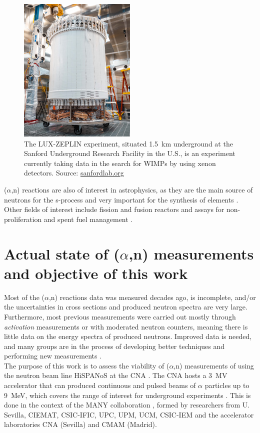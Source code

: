 \documentclass[a4paper,12pt]{report}
\newcommand{\an}{($\alpha$,n) }
\begin{document}
\begin{figure}[H]
	\centering
	\includegraphics[width=0.5\textwidth]{sanford.jpg}
	\caption{The LUX-ZEPLIN experiment, situated \qty{1.5}{\kilo\meter} underground at the Sanford Underground Research Facility in the U.S., is an experiment currently taking data in the search for WIMPs by using xenon detectors.
	Source: \href{https://sanfordlab.org/experiment/lux-zeplin}{sanfordlab.org}}
	\label{sanford}
\end{figure}

\an reactions are also of interest in astrophysics, as they are the main source of neutrons for the s-process and very important for the synthesis of elements \cite{astro1, astro2}.
Other fields of interest include fission and fusion reactors and assays for non-proliferation and spent fuel management \cite{INDC}.

\section{Actual state of \an measurements and objective of this work}
Most of the \an reactions data was measured decades ago, is incomplete, and/or the uncertainties in cross sections and produced neutron spectra are very large.
Furthermore, most previous measurements were carried out mostly through \textit{activation} measurements or with moderated neutron counters, meaning there is little data on the energy spectra of produced neutrons.
Improved data is needed, and many groups are in the process of developing better techniques and performing new measurements \cite{INDC}.
\\

The purpose of this work is to assess the viability of \an measurements of using the neutron beam line HiSPANoS at the CNA \cite{CNA}.
The CNA hosts a \qty{3}{\mega\volt} accelerator that can produced continuous and pulsed beams of $\alpha$ particles up to \qty{9}{\MeV}, which covers the range of interest for underground experiments \cite{hispanos}.
This is done in the context of the MANY collaboration \cite{MANY}, formed by researchers from U. Sevilla, CIEMAT, CSIC-IFIC, UPC, UPM, UCM, CSIC-IEM and the accelerator laboratories CNA (Sevilla) and CMAM (Madrid).
\\
\end{document}
